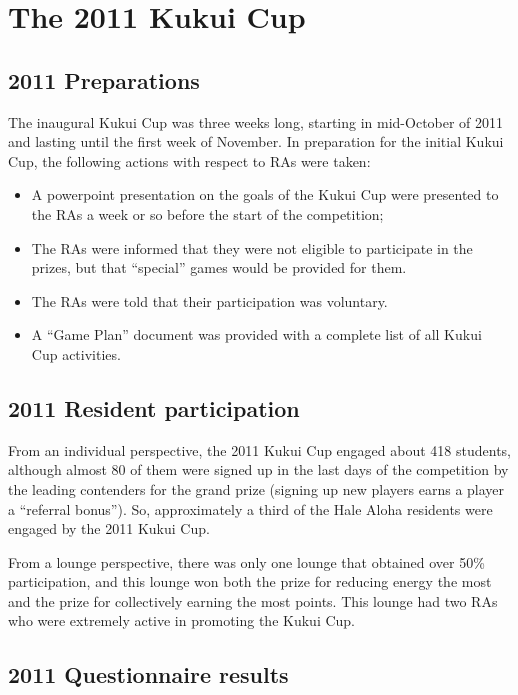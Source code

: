 \documentclass[]{article}
\begin{document}
\section{The 2011 Kukui Cup}

\subsection{2011 Preparations}

The inaugural Kukui Cup was three weeks long, starting in mid-October of 2011 and lasting
until the first week of November.  In preparation for the initial Kukui Cup, the following
actions with respect to RAs were taken:

\begin{itemize}[nolistsep]
\item A powerpoint presentation on the goals of the Kukui Cup were presented to the RAs a
  week or so before the start of the competition;
\item The RAs were informed that they were not eligible to participate in the prizes, but
  that ``special'' games would be provided for them.
\item The RAs were told that their participation was voluntary. 
\item A ``Game Plan'' document was provided with a complete list of all Kukui Cup activities.
\end{itemize}

\subsection{2011 Resident participation}

From an individual perspective, the 2011 Kukui Cup engaged about 418 students, although almost 80 of them were signed up in the
last days of the competition by the leading contenders for the grand prize (signing up new
players earns a player a ``referral bonus'').  So, approximately a third of the Hale Aloha
residents were engaged by the 2011 Kukui Cup.  

From a lounge perspective, there was only one lounge that obtained over 50\%
participation, and this lounge won both the prize for reducing energy the most and the
prize for collectively earning the most points.   This lounge had two RAs
who were extremely active in promoting the Kukui Cup. 

\subsection{2011 Questionnaire results}
\end{document}
